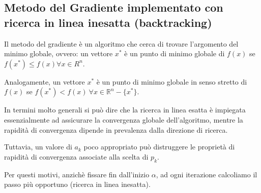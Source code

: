 {\color{oorange}\subsection{Metodo del Gradiente implementato con ricerca in linea inesatta (backtracking)}}
Il metodo del gradiente è un algoritmo che cerca di trovare l'argomento del minimo globale, ovvero:
un vettore $x^{\ast}$ è un punto di minimo globale di $f(x)$ se $f(x^{\ast}) \leq f(x) \forall x \in R^n$.

Analogamente, un vettore $x^{\ast}$ è un punto di minimo globale in senso stretto di $f(x)$ 
se $f(x^{\ast}) < f(x) \: \forall x \in \mathbb{R}^n - \{x^{\ast}\}$.

In termini molto generali si può dire che la ricerca in linea esatta è impiegata essenzialmente ad assicurare 
la convergenza globale dell'algoritmo, mentre la rapidità di convergenza dipende in prevalenza dalla direzione 
di ricerca. 

Tuttavia, un valore di $a_k$ poco appropriato può distruggere le proprietà di rapidità di convergenza associate 
alla scelta di $p_k$.

Per questi motivi, anzichè fissare fin dall'inizio $\alpha$, ad ogni iterazione calcoliamo il passo più opportuno 
(ricerca in linea inesatta).

